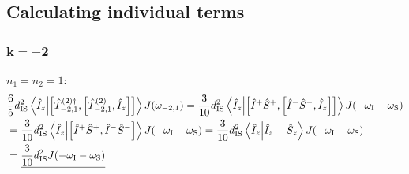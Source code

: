 \begin{appendixtext}
\subsection{Calculating individual terms} \label{subsecB.2.1}
\subsubsection{$\mathbf{k = -2}$}
$n_1 = n_2 = 1$:
\begin{align*}
&\frac{6}{5} d_{\text{IS}}^2 \bra{\hat{I}_z} \ket{\comm{\hat{T}_{-2, 1}^{(2) \dagger}}{\comm{\hat{T}_{-2,1}^{(2)}}{\hat{I}_z}}} J(\omega_{-2,1}) = \frac{3}{10} d_{\text{IS}}^2 \bra{\hat{I}_z} \ket{\comm{\hat{I}^+ \hat{S}^+}{\comm{\hat{I}^- \hat{S}^-}{\hat{I}_z}}} J(-\omega_{\text{I}} - \omega_{\text{S}}) \\
&= \frac{3}{10} d_{\text{IS}}^2 \bra{\hat{I}_z} \ket{\comm{\hat{I}^+ \hat{S}^+}{\hat{I}^- \hat{S}^-}} J(-\omega_{\text{I}} - \omega_{\text{S}}) = \frac{3}{10} d_{\text{IS}}^2 \bra{\hat{I}_z} \ket{\hat{I}_z + \hat{S}_z} J(-\omega_{\text{I}} - \omega_{\text{S}}) \\
& = \underline{\frac{3}{10} d_{\text{IS}}^2 J(-\omega_{\text{I}} - \omega_{\text{S}})}
\end{align*}

\end{appendixtext}
